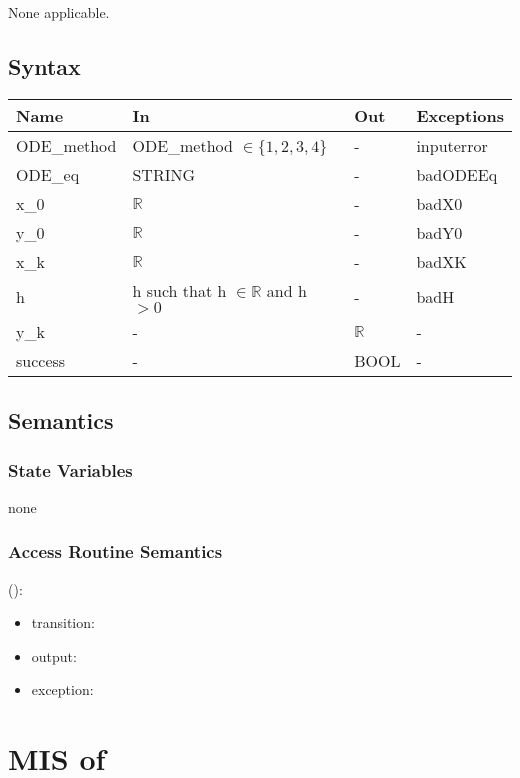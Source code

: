 \documentclass[12pt, titlepage]{article}
\begin{document}
None applicable.

\subsection{Syntax}

\begin{center}
\begin{tabular}{p{4cm} p{4cm} p{4cm} p{2cm}}
\hline
\textbf{Name} & \textbf{In} & \textbf{Out} & \textbf{Exceptions} \\
\hline
ODE\_method & ODE\_method $\in \{1, 2, 3, 4\}$  & - &  inputerror\\
ODE\_eq & STRING & - & badODEEq\\
x\_0 & $\mathbb{R}$ & - & badX0\\
y\_0 & $\mathbb{R}$ & - & badY0\\
x\_k & $\mathbb{R}$ & - & badXK\\
h & h such that h $\in \mathbb{R}$ and h $> 0$ & - & badH\\
y\_k & - & $\mathbb{R}$ & - \\
success & - & BOOL & - \\
\hline
\end{tabular}
\end{center}

\subsection{Semantics}

\subsubsection{State Variables}
none

\subsubsection{Access Routine Semantics}

\noindent {}():
\begin{itemize}
\item transition:  
\item output:  
\item exception:  
\end{itemize}

\newpage


\section{MIS of } \label{Module} 
\end{document}
